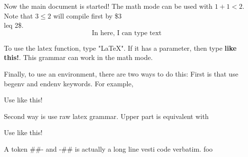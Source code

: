 \documentclass[item,korean]{coprime}
\begin{document}
Now the main document is started! The math mode can be used with $1+1<2$.
Note that $3\leq 2$ will compile first by \$3\\leq 2\$.
\[
    \text{In here, I can type text}
\]

To use the latex function, type "LaTeX". If it has a parameter,
then type \textbf{like this!}. This grammar can work in the math mode.

Finally, to use an environment, there are two ways to do this:
First is that use begenv and endenv keywords. For example,
\begin{center}
    \begin{minipage}{0.7\textwidth}
        Use like this!
    \end{minipage}
\end{center}

Second way is use raw latex grammar. Upper part is equivalent with

\begin{center}
    \begin{minipage}{0.7\textwidth}
        Use like this!
    \end{minipage}
\end{center}


A token \#\#- and -\#\# is actually a long line vesti code verbatim.
foo
\end{document}
